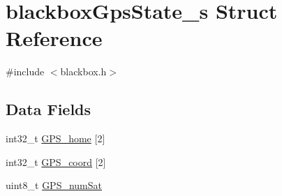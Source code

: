 \hypertarget{structblackboxGpsState__s}{\section{blackbox\+Gps\+State\+\_\+s Struct Reference}
\label{structblackboxGpsState__s}
}


{\ttfamily \#include $<$blackbox.\+h$>$}

\subsection*{Data Fields}
\begin{DoxyCompactItemize}
\item 
int32\+\_\+t \hyperlink{structblackboxGpsState__s_a3b7943c2236ac2b26a14b0c7f83dd998}{G\+P\+S\+\_\+home} \mbox{[}2\mbox{]}
\item 
int32\+\_\+t \hyperlink{structblackboxGpsState__s_a6af2131bfa30f5681b191f0b7dce37fe}{G\+P\+S\+\_\+coord} \mbox{[}2\mbox{]}
\item 
uint8\+\_\+t \hyperlink{structblackboxGpsState__s_a644bd9860f4f3b4d1e2f4f80ff224559}{G\+P\+S\+\_\+num\+Sat}
\end{DoxyCompactItemize}


